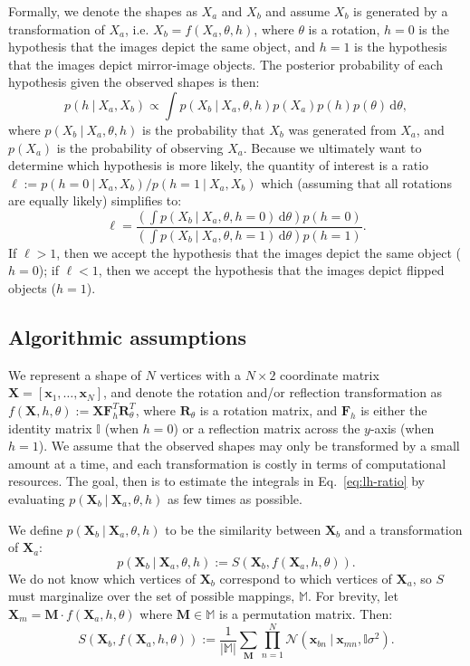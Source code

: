 \documentclass[10pt,letterpaper]{article}
\newcommand{\Xa}[0]{\mathbf{X}_a}
\newcommand{\Xb}[0]{\mathbf{X}_b}
\newcommand{\R}[0]{\mathbf{R}_\theta}
\newcommand{\F}[0]{\mathbf{F}}
\newcommand{\M}[0]{\mathbf{M}}
\newcommand{\I}[0]{\mathbb{I}}
\newcommand{\hi}[0]{h=0}
\newcommand{\hf}[0]{h=1}
\newcommand{\dif}[0]{\,\mathrm{d}}
\begin{document}
Formally, we denote the shapes as $X_a$ and $X_b$ and assume $X_b$ is
generated by a transformation of $X_a$, i.e. $X_b=f(X_a, \theta, h)$,
where $\theta$ is a rotation, $h=0$ is the hypothesis that the images
depict the same object, and $h=1$ is the hypothesis that the images
depict mirror-image objects. The posterior probability of each
hypothesis given the observed shapes is then:
\begin{equation}
  p(h\ \vert\ X_a, X_b) \propto \int p(X_b\ \vert\ X_a, \theta, h)p(X_a)p(h)p(\theta)\dif\theta,
  \label{eq:posterior}
\end{equation}
where $p(X_b\ \vert\ X_a, \theta, h)$ is the probability that $X_b$
was generated from $X_a$, and $p(X_a)$ is the probability of observing
$X_a$. Because we ultimately want to determine which hypothesis is
more likely, the quantity of interest is a ratio $\ell:=p(h=0\ \vert\
X_a, X_b) / p(h=1\ \vert\ X_a, X_b)$ which (assuming that all
rotations are equally likely) simplifies to:
\begin{equation}
  \ell = \frac{\left(\int p(X_b\ \vert\ X_a, \theta, \hi)\dif\theta\right)p(h=0)}{\left(\int p(X_b\ \vert\ X_a, \theta, \hf)\dif\theta\right)p(h=1)}.
  \label{eq:lh-ratio}
\end{equation}
If $\ell > 1$, then we accept the hypothesis that the images depict
the same object ($\hi$); if $\ell < 1$, then we accept the hypothesis
that the images depict flipped objects ($\hf$).

\subsection{Algorithmic assumptions}

We represent a shape of $N$ vertices with a $N\times 2$ coordinate
matrix $\mathbf{X}=[\mathbf{x}_1, \ldots{}, \mathbf{x}_N]$, and denote
the rotation and/or reflection transformation as $f(\mathbf{X}, h,
\theta):=\mathbf{X}\F_h^T\R^T$, where $\R$ is a rotation matrix, and
$\F_h$ is either the identity matrix $\I$ (when $h=0$) or a reflection
matrix across the $y$-axis (when $h=1$).  We assume that the observed
shapes may only be transformed by a small amount at a time, and each
transformation is costly in terms of computational resources. The
goal, then is to estimate the integrals in Eq.~\ref{eq:lh-ratio} by
evaluating $p(\Xb\ \vert\ \Xa, \theta, h)$ as few times as possible.

We define $p(\Xb\ \vert\ \Xa, \theta, h)$ to be the similarity between
$\Xb$ and a transformation of $\Xa$:
\begin{equation}
  p(\Xb\ \vert\ \Xa, \theta, h):= S(\Xb, f(\Xa, h, \theta)).
  \label{eq:likelihood}
\end{equation}
We do not know which vertices of $\Xb$ correspond to which vertices of
$\Xa$, so $S$ must marginalize over the set of possible mappings,
$\mathbb{M}$. For brevity, let $\mathbf{X}_m=\M\cdot{}f(\Xa, h,
\theta)$ where $\M\in\mathbb{M}$ is a permutation matrix. Then:
\begin{equation}
  S(\Xb, f(\Xa, h, \theta)):=\frac{1}{|\mathbb{M}|} \sum_{\M} \prod_{n=1}^N \mathcal{N}(\mathbf{x}_{bn}\ \vert \ \mathbf{x}_{mn}, \I\sigma^2).
  \label{eq:similarity}
\end{equation}
\end{document}
